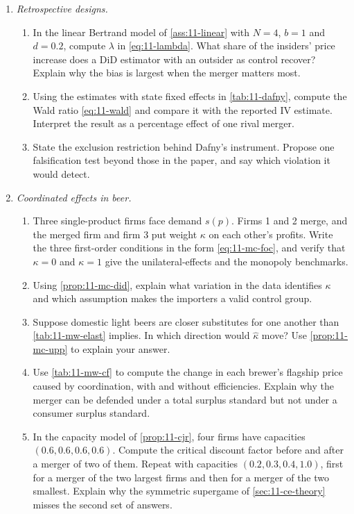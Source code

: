 \begin{enumerate}[label=\arabic*., leftmargin=*, itemsep=6pt]
\item \emph{Retrospective designs.}
\begin{enumerate}[label=(\alph*)]
\item In the linear Bertrand model of \cref{ass:11-linear} with $N = 4$, $b = 1$ and $d = 0.2$, compute $\lambda$ in
\eqref{eq:11-lambda}. What share of the insiders' price increase does a DiD estimator with an outsider as control
recover? Explain why the bias is largest when the merger matters most.
\item Using the estimates with state fixed effects in \cref{tab:11-dafny}, compute the Wald ratio \eqref{eq:11-wald}
and compare it with the reported IV estimate. Interpret the result as a percentage effect of one rival merger.
\item State the exclusion restriction behind Dafny's instrument. Propose one falsification test beyond those in the
paper, and say which violation it would detect.
\end{enumerate}

\item \emph{Coordinated effects in beer.}
\begin{enumerate}[label=(\alph*)]
\item Three single-product firms face demand $s(p)$. Firms 1 and 2 merge, and the merged firm and firm 3 put weight
$\kappa$ on each other's profits. Write the three first-order conditions in the form \eqref{eq:11-mc-foc}, and verify
that $\kappa = 0$ and $\kappa = 1$ give the unilateral-effects and the monopoly benchmarks.
\item Using \cref{prop:11-mc-did}, explain what variation in the data identifies $\kappa$ and which assumption makes
the importers a valid control group.
\item Suppose domestic light beers are closer substitutes for one another than \cref{tab:11-mw-elast} implies. In which
direction would $\hat\kappa$ move? Use \cref{prop:11-mc-upp} to explain your answer.
\item Use \cref{tab:11-mw-cf} to compute the change in each brewer's flagship price caused by coordination, with and
without efficiencies. Explain why the merger can be defended under a total surplus standard but not under a consumer
surplus standard.
\item In the capacity model of \cref{prop:11-cjr}, four firms have capacities $(0.6, 0.6, 0.6, 0.6)$. Compute the
critical discount factor before and after a merger of two of them. Repeat with capacities $(0.2, 0.3, 0.4, 1.0)$,
first for a merger of the two largest firms and then for a merger of the two smallest. Explain why the symmetric
supergame of \cref{sec:11-ce-theory} misses the second set of answers.
\end{enumerate}

\end{enumerate}
